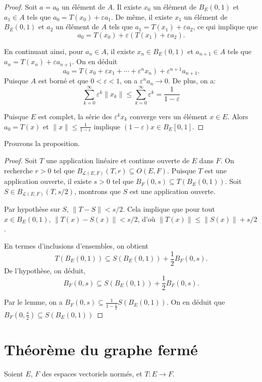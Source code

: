 \begin{proof}
  Soit $a = a_0$ un élément de $A$. Il existe $x_0$ un élément
  de $B_E(0, 1)$ et $a_1\in A$ tels que $a_0 = T(x_0) + \varepsilon a_1$.
  De même, il existe $x_1$ un élément de $B_E(0, 1)$ et $a_2$ un élément
  de $A$ tels que $a_1 = T(x_1) + \varepsilon a_2$, ce qui implique
  que
  $$a_0 = T(x_0) + \varepsilon (T(x_1) +\varepsilon a_2).$$

  En continuant ainsi, pour $a_n\in A$, il existe $x_n\in B_E(0, 1)$
  et $a_{n+1}\in A$ tels que $a_n = T(x_n) + \varepsilon a_{n+1}$. On en déduit
  $$a_0 = T(x_0 + \varepsilon x_1 + \cdots + \varepsilon^nx_n)+%
  \varepsilon^{n+1}a_{n+1}.$$
  Puisque $A$ est borné et que $0 < \varepsilon < 1$, on a
  $\varepsilon^na_n \to 0$. De plus, on a:
  $$\sum_{k=0}^{\infty}\varepsilon^k\|x_k\| \leq%
  \sum_{k=0}^{\infty}\varepsilon^k = \frac{1}{1-\varepsilon}$$

  Puisque $E$ est complet, la série des $\varepsilon^kx_k$ converge
  vers un élément $x\in E$. Alors $a_0 = T(x)$ et $\|x\|\leq
  \frac{1}{1-\varepsilon}$ implique $(1-\varepsilon)x \in B_E[0, 1]$.
\end{proof}
Prouvons la proposition.
\begin{proof}
  Soit $T$ une application linéaire et continue ouverte de $E$ dans $F$.
  On recherche $r>0$ tel que $B_{\mathscr L(E, F)}(T, r)\subseteq O(E, F)$.
  Puisque $T$ est une application ouverte, il existe $s>0$ tel que
  $B_F(0, s)\subseteq T(B_E(0, 1))$. Soit $S\in B_{\mathscr L(E, F)}(T, s/2)$,
  montrons que $S$ est une application ouverte.

  Par hypothèse sur $S$, $\|T-S\| < s/2$. Cela implique que pour tout
  $x\in B_E(0, 1)$, $\|T(x) - S(x)\|< s/2$, d'où $\|T(x)\|\leq \| S(x)\| + s/2$.

  En termes d'inclusions d'ensembles, on obtient
  $$T(B_E(0, 1)) \subseteq S(B_E(0, 1))+\frac{1}{2}B_F(0, s).$$
  De l'hypothèse, on déduit,
  $$B_F(0, s) \subseteq S(B_E(0, 1))+\frac{1}{2}B_F(0, s).$$

  Par le lemme, on a $B_F(0, s)\subseteq\frac{1}{1-\frac{1}{2}}S(B_E(0, 1))$.
  On en déduit que $B_F(0, \frac{s}{2})\subseteq S(B_E(0, 1))$
\end{proof}

\section{Théorème du graphe fermé}
Soient $E$, $F$ des espaces vectoriels normés, et $T: E\to F$.

